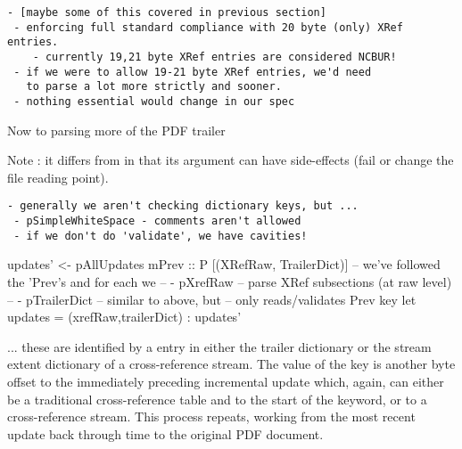 \begin{lstlisting}[style=meta]
 - [maybe some of this covered in previous section]
 - enforcing full standard compliance with 20 byte (only) XRef entries.
    - currently 19,21 byte XRef entries are considered NCBUR!
 - if we were to allow 19-21 byte XRef entries, we'd need
   to parse a lot more strictly and sooner.
 - nothing essential would change in our spec
\end{lstlisting}

  
Now to parsing more of the PDF trailer

Note : it differs from  in that
its argument can have side-effects (fail or change the file reading point).

\begin{lstlisting}[style=meta]
 - generally we aren't checking dictionary keys, but ...
 - pSimpleWhiteSpace - comments aren't allowed
 - if we don't do 'validate', we have cavities!
\end{lstlisting}


\begin{code}
    updates' <- pAllUpdates mPrev :: P [(XRefRaw, TrailerDict)]
       -- we've followed the 'Prev's and for each we
       --   - pXrefRaw     -- parse XRef subsections (at raw level)
       --   - pTrailerDict -- similar to above, but
       --                     only reads/validates Prev key
    let updates = (xrefRaw,trailerDict) : updates'
\end{code}

... these are identified by a  entry in either the trailer
dictionary or the stream extent dictionary of a cross-reference stream. The
value of the  key is another byte offset to the immediately
preceding incremental update which, again, can either be a traditional
cross-reference table and to the start of the  keyword, or to a
cross-reference stream. This process repeats, working from the most recent
update back through time to the original PDF document.

